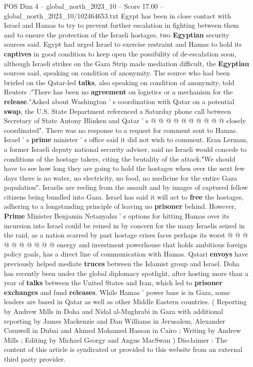 \begin{textsample}{POS Dim 4 – global\_north\_2023\_10 – Score 17.00 – global\_north\_2023\_10/102464653.txt}
Egypt has been in close contact with Israel and Hamas to try to prevent further escalation in fighting between them and to ensure the protection of the Israeli hostages, two \textbf{Egyptian} security sources said.
Egypt had urged Israel to exercise restraint and Hamas to hold its \textbf{captives} in good condition to keep open the possibility of de-escalation soon, although Israeli strikes on the Gaza Strip made mediation difficult, the \textbf{Egyptian} sources said, speaking on condition of anonymity.
The source who had been briefed on the Qatar-led \textbf{talks}, also speaking on condition of anonymity, told Reuters :"There has been no \textbf{agreement} on logistics or a mechanism for the \textbf{release}."Asked about Washington ' s coordination with Qatar on a potential \textbf{swap}, the U.S.
State Department referenced a Saturday phone call between Secretary of State Antony Blinken and Qatar ' s @ @ @ @ @ @ @ @ @ @ closely coordinated".
There was no response to a request for comment sent to Hamas.
Israel ' s \textbf{prime} minister ' s office said it did not wish to comment.
Eran Lerman, a former Israeli deputy national security adviser, said no Israeli would concede to conditions of the hostage takers, citing the brutality of the attack."We should have to see how long they are going to hold the hostages when over the next few days there is no water, no electricity, no food, no medicine for the entire Gaza population".
Israelis are reeling from the assault and by images of captured fellow citizens being bundled into Gaza.
Israel has said it will act to \textbf{free} the hostages, adhering to a longstanding principle of leaving no \textbf{prisoner} behind.
However, \textbf{Prime} Minister Benjamin Netanyahu ' s options for hitting Hamas over its incursion into Israel could be reined in by concern for the many Israelis seized in the raid, as a nation scarred by past hostage crises faces perhaps its worst @ @ @ @ @ @ @ @ @ @ energy and investment powerhouse that holds ambitious foreign policy goals, has a direct line of communication with Hamas.
Qatari \textbf{envoys} have previously helped mediate \textbf{truces} between the Islamist group and Israel.
Doha has recently been under the global diplomacy spotlight, after hosting more than a year of \textbf{talks} between the United States and Iran, which led to \textbf{prisoner} \textbf{exchanges} and fund \textbf{releases}.
While Hamas ' power base is in Gaza, some leaders are based in Qatar as well as other Middle Eastern countries. ( Reporting by Andrew Mills in Doha and Nidal al-Mughrabi in Gaza with additional reporting by James Mackenzie and Dan Williams in Jerusalem, Alexander Cornwell in Dubai and Ahmed Mohamed Hassan in Cairo ; Writing by Andrew Mills ; Editing by Michael Georgy and Angus MacSwan ) Disclaimer : The content of this article is syndicated or provided to this website from an external third party provider.

\end{textsample}
